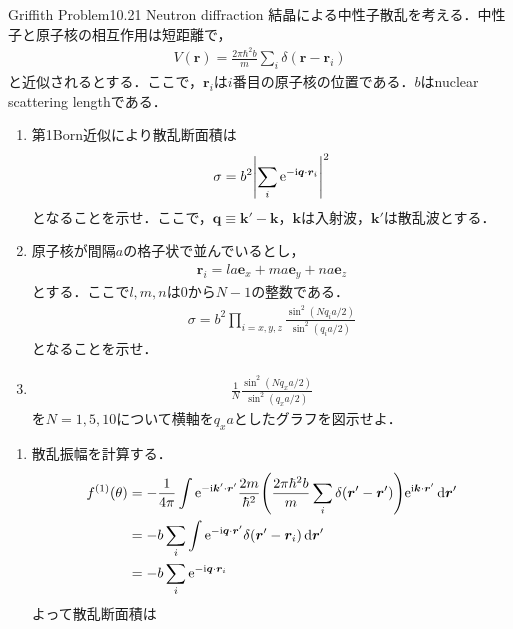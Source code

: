 \documentclass{report}
\begin{document}
  \begin{myexc}{Griffith Problem10.21 Neutron diffraction}{}
  結晶による中性子散乱を考える．中性子と原子核の相互作用は短距離で，
  \begin{align}
    V(\bm{r}) = \frac{2\pi\hbar^2 b}{m} \sum_{i}\delta(\bm{r} - \bm{r}_i)
  \end{align}
  と近似されるとする．ここで，$\bm{r}_i$は$i$番目の原子核の位置である．$b$はnuclear scattering lengthである．
  \begin{enumerate}
    \item 第1Born近似により散乱断面積は
          \begin{align}
            \sigma = b^2 \abs{\sum_{i} \mathrm{e}^{-\mathrm{i} \bm{q}\cdot\bm{r}_i}}^2
          \end{align}
          となることを示せ．ここで，$\bm{q}\equiv\bm{k}' - \bm{k}$，$\bm{k}$は入射波，$\bm{k}'$は散乱波とする．
    \item 原子核が間隔$a$の格子状で並んでいるとし，
          \begin{align}
            \bm{r}_i = la\bm{e}_x + ma\bm{e}_y + na\bm{e}_z
          \end{align}
          とする．ここで$l,m,n$は0から$N-1$の整数である．
          \begin{align}
            \sigma = b^2 \prod_{i =x,y,z} \frac{\sin^2(Nq_i a/2)}{\sin^2 (q_i a/2)}
          \end{align}
          となることを示せ．
    \item \begin{align}
            \frac{1}{N}\frac{\sin^2(Nq_x a/2)}{\sin^2 (q_x a/2)}
          \end{align}
          を$N=1,5,10$について横軸を$q_xa$としたグラフを図示せよ．
  \end{enumerate}
  \tcblower
  \begin{enumerate}
    \item 散乱振幅を計算する．
          \begin{align}
            f^{(1)}(\theta) &= -\frac{1}{4\pi} \int \mathrm{e}^{-\mathrm{i}\bm{k}' \cdot \bm{r}'} \frac{2m}{\hbar^2} \qty(\frac{2\pi\hbar^2 b}{m} \sum_{i} \delta(\bm{r}' - \bm{r}'))\mathrm{e}^{\mathrm{i} \bm{k}\cdot\bm{r}'} \dd{\bm{r}'}\\
            &= -b \sum_{i} \int \mathrm{e}^{-\mathrm{i}\bm{q}\cdot \bm{r}'} \delta(\bm{r}' - \bm{r}_i) \dd{\bm{r}'}\\
            &= -b \sum_{i} \mathrm{e}^{-\mathrm{i} \bm{q}\cdot\bm{r}_i}
          \end{align}
          よって散乱断面積は
          \begin{align}

\end{align}
\end{enumerate}
\end{myexc}
\end{document}
